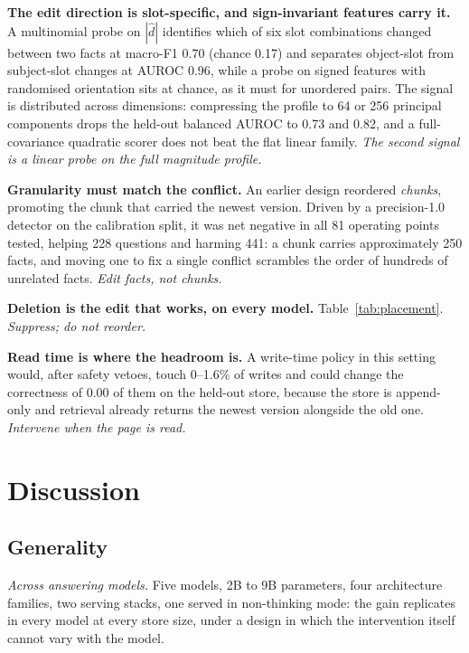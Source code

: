 \documentclass[journal=jcisd8,manuscript=article]{achemso}
\begin{document}
\textbf{The edit direction is slot-specific, and sign-invariant features carry it.} A multinomial probe on $|\hat d|$ identifies which of six slot combinations changed between two facts at macro-F1 0.70 (chance 0.17) and separates object-slot from subject-slot changes at AUROC 0.96, while a probe on signed features with randomised orientation sits at chance, as it must for unordered pairs. The signal is distributed across dimensions: compressing the profile to 64 or 256 principal components drops the held-out balanced AUROC to 0.73 and 0.82, and a full-covariance quadratic scorer does not beat the flat linear family. \emph{The second signal is a linear probe on the full magnitude profile.}

\textbf{Granularity must match the conflict.} An earlier design reordered \emph{chunks}, promoting the chunk that carried the newest version. Driven by a precision-1.0 detector on the calibration split, it was net negative in all 81 operating points tested, helping 228 questions and harming 441: a chunk carries approximately 250 facts, and moving one to fix a single conflict scrambles the order of hundreds of unrelated facts. \emph{Edit facts, not chunks.}

\textbf{Deletion is the edit that works, on every model.} Table~\ref{tab:placement}. \emph{Suppress; do not reorder.}

\textbf{Read time is where the headroom is.} A write-time policy in this setting would, after safety vetoes, touch 0--1.6\% of writes and could change the correctness of 0.00 of them on the held-out store, because the store is append-only and retrieval already returns the newest version alongside the old one. \emph{Intervene when the page is read.}


\section{Discussion}

\subsection{Generality}

\emph{Across answering models.} Five models, 2B to 9B parameters, four architecture families, two serving stacks, one served in non-thinking mode: the gain replicates in every model at every store size, under a design in which the intervention itself cannot vary with the model.
\end{document}
